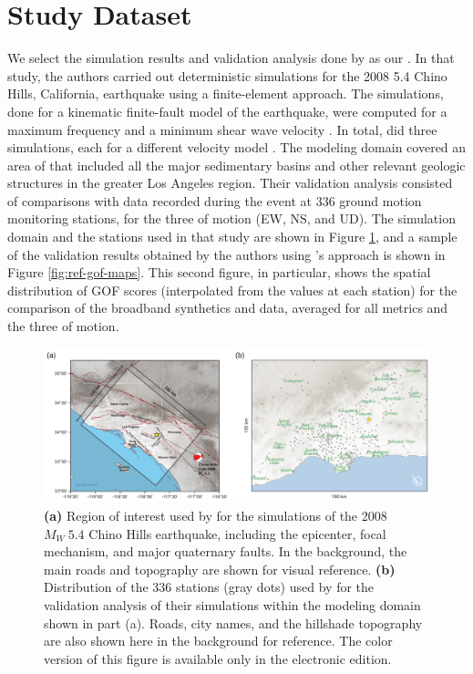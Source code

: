 
\section{Study Dataset}

We select the simulation results and validation analysis done by \citet{Taborda_2014_BSSA} as our . In that study, the authors carried out deterministic simulations for the 2008  5.4 Chino Hills, California, earthquake using a finite-element approach. The simulations, done for a kinematic finite-fault model of the earthquake, were computed for a maximum frequency  and a minimum shear wave velocity . In total, \citet{Taborda_2014_BSSA} did three simulations, each for a different velocity model \citep[CVM-S4, CVM-H, CVM-H+GTL, see][]{Small_2017_SRL}. The modeling domain covered an area of  that included all the major sedimentary basins and other relevant geologic structures in the greater Los Angeles region. Their validation analysis consisted of comparisons with data recorded during the event at 336 ground motion monitoring stations, for the three  of motion (EW, NS, and UD). The simulation domain and the stations used in that study are shown in Figure \ref{fig:chino-hills}, and a sample of the validation results obtained by the authors using \citeauthor{Anderson_2004_Proc}'s approach is shown in Figure \ref{fig:ref-gof-maps}. This second figure, in particular, shows the spatial distribution of GOF scores (interpolated from the values at each station) for the comparison of the broadband synthetics and data, averaged for all metrics and the three  of motion.

\begin{figure}[ht!]
    \centering
    \includegraphics[width=\textwidth]{figures/pdf/figure-01}
    \caption{\textbf{(a)} Region of interest used by \citet{Taborda_2014_BSSA} for the simulations of the 2008 $M_W ~ 5.4$ Chino Hills earthquake, including the epicenter, focal mechanism, and major quaternary faults. In the background, the main roads and topography are shown for visual reference. \textbf{(b)} Distribution of the 336 stations (gray dots) used by \citet{Taborda_2014_BSSA} for the validation analysis of their simulations within the modeling domain shown in part (a). Roads, city names, and the hillshade topography are also shown here in the background for reference. The color version of this figure is available only in the electronic edition.}
    \label{fig:chino-hills}
\end{figure}

